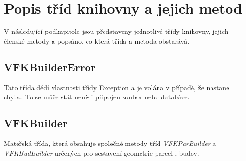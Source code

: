 \section{Popis tříd knihovny a jejich metod}
\label{sec:popis_trid}
V následující podkapitole jsou představeny jednotlivé třídy knihovny,
jejich členské metody a popsáno, co která třída a metoda obstarává.

\subsection{VFKBuilderError}
Tato třída dědí vlastnosti třídy Exception a je volána v případě, že
nastane chyba. To se může stát není-li připojen  soubor nebo
databáze.
\subsection{VFKBuilder}
\label{subsec:sestaveni_geometrie}
Mateřská třída, která obsahuje společné metody tříd
\textit{VFKParBuilder} a \textit{VFKBudBuilder} určených pro sestavení
geometrie parcel i budov.
